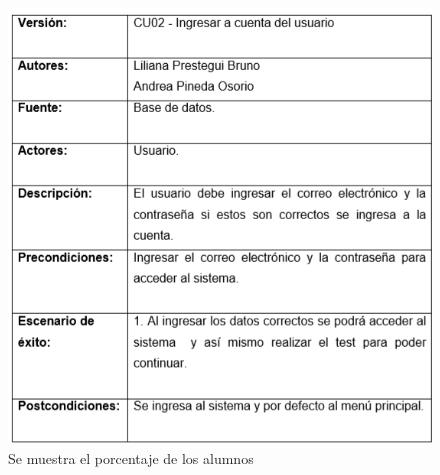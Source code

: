 \documentclass[letterpaper,oneside,openany,11pt]{book}
\begin{document}
\begin{figure}[H]
	\centering
	\includegraphics[width=1.0\textwidth]{./Imagenes/14}
	\caption{Se muestra el porcentaje de los alumnos}
\end{figure}
\end{document}
